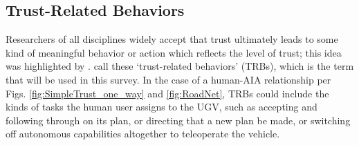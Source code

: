 \subsection{Trust-Related Behaviors} \label{sec:trbs}
Researchers of all disciplines widely accept that trust ultimately leads to some kind of meaningful behavior or action which reflects the level of trust; this idea was highlighted by \citet{Lewis1985-pr}.  \citet{McKnight2001-fa} call these `trust-related behaviors' (TRBs), which is the term that will be used in this survey. In the case of a human-AIA relationship per Figs. \ref{fig:SimpleTrust_one_way} and \ref{fig:RoadNet}, TRBs could include the kinds of tasks the human user assigns to the UGV, such as accepting and following through on its plan, or directing that a new plan be made, or switching off autonomous capabilities altogether to teleoperate the vehicle. 

